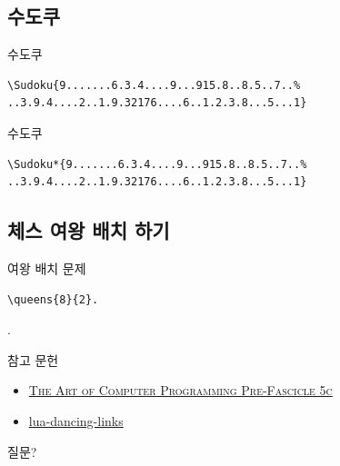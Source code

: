 \documentclass[xcolor=svgnames]{beamer}
\begin{document}
%
\subsection{수도쿠}

%
\begin{frame}[fragile]{수도쿠}
\begin{verbatim}
\Sudoku{9.......6.3.4....9...915.8..8.5..7..%
..3.9.4....2..1.9.32176....6..1.2.3.8...5...1}
\end{verbatim}  
\begin{center}
\end{center}
\end{frame}

%
\begin{frame}[fragile]{수도쿠}
\begin{verbatim}
\Sudoku*{9.......6.3.4....9...915.8..8.5..7..%
..3.9.4....2..1.9.32176....6..1.2.3.8...5...1}
\end{verbatim}
\begin{center}
\end{center}
\end{frame}

%
\subsection{체스 여왕 배치 하기}

%
\begin{frame}[fragile]{여왕 배치 문제}
\begin{verbatim}
\queens{8}{2}.
\end{verbatim}
\vspace{-10mm}
.
\end{frame}

%
\begin{frame}{참고 문헌}
  \begin{itemize}
  \item \href{http://www-cs-faculty.stanford.edu/~knuth/fasc5c.ps.gz}
    {\textsc{The Art of Computer Programming Pre-Fascicle 5c}}
  \item \href{https://github.com/sjnam/lua-dancing-links}
    {lua-dancing-links}
  \end{itemize}
\end{frame}

%
\begin{frame}[standout]
  질문?
\end{frame}
\end{document}
